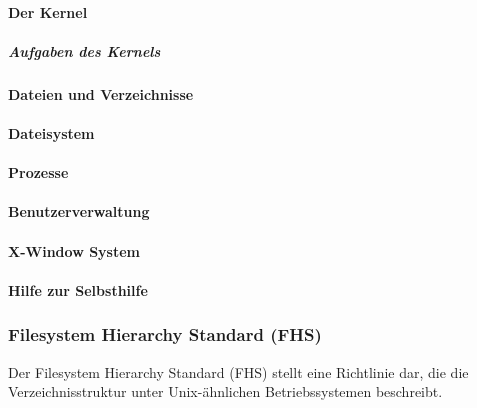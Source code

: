 \paragraph{Der Kernel}

\subparagraph{Aufgaben des Kernels}

\paragraph{Dateien und Verzeichnisse}

\paragraph{Dateisystem}

\paragraph{Prozesse}

\paragraph{Benutzerverwaltung}

\paragraph{X-Window System}

\paragraph{Hilfe zur Selbsthilfe}

\subsubsection{Filesystem Hierarchy Standard (FHS)}

Der Filesystem Hierarchy Standard (FHS) stellt eine Richtlinie dar, die die Verzeichnisstruktur unter Unix-ähnlichen Betriebssystemen beschreibt.





